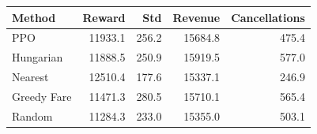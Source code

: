 \begin{tabular}{lrrrr}
\toprule
Method & Reward & Std & Revenue & Cancellations \\
\midrule
PPO & 11933.1 & 256.2 & 15684.8 & 475.4 \\
Hungarian & 11888.5 & 250.9 & 15919.5 & 577.0 \\
Nearest & 12510.4 & 177.6 & 15337.1 & 246.9 \\
Greedy Fare & 11471.3 & 280.5 & 15710.1 & 565.4 \\
Random & 11284.3 & 233.0 & 15355.0 & 503.1 \\
\bottomrule
\end{tabular}
